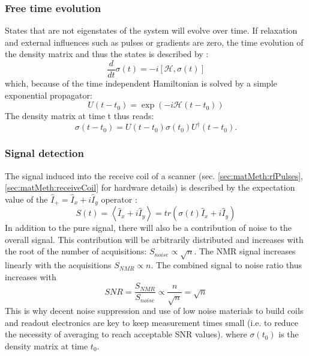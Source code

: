         \subsubsection{Free time evolution}
        States that are not eigenstates of the system will evolve over time. If relaxation and external influences such as pulses or gradients are zero, the time evolution of the density matrix and thus the states is described by \cite{sakurai_modern_2017, levitt_spin_nodate}:
        \begin{equation}
            \frac{d}{dt} \sigma(t) = -i \left[\mathcal{H}, \sigma(t)\right]
        \end{equation}
        which, because of the time independent Hamiltonian is solved by a simple exponential propagator:
        \begin{equation*}
            U(t-t_0) = \exp(-i\mathcal{H}(t-t_0))
        \end{equation*}
        The density matrix at time t thus reads:
        \begin{equation}
            \sigma(t-t_0) = U(t-t_0) \sigma(t_0) U^\dagger(t-t_0).
        \end{equation}
        \subsubsection{Signal detection}
        The signal induced into the receive coil of a scanner (sec. \ref{sec:matMeth:rfPulses}, \ref{sec:matMeth:receiveCoil} for hardware details) is described by the expectation value of the $\hat{I}_+ = \hat{I}_x + i\hat{I}_y$ operator \cite{levitt_spin_nodate}:
        \begin{equation}
            S(t) = \left< \hat{I}_x + i\hat{I}_y \right> = tr\left(\sigma(t)\hat{I}_x + i\hat{I}_y\right)
        \end{equation}
        In addition to the pure signal, there will also be a contribution of noise to the overall signal. This contribution will be arbitrarily distributed and increases with the root of the number of acquisitions: $S_{noise} \propto \sqrt{n}$. The NMR signal increases linearly with the acquisitions $S_{NMR} \propto n$. The combined signal to noise ratio thus increases with
        \begin{equation}
            SNR =  \frac{S_{NMR}}{ S_{noise}}  \propto \frac{n}{\sqrt{n}} = \sqrt{n}
        \end{equation}
        This is why decent noise suppression and use of low noise materials to build coils and readout electronics are key to keep measurement times small (i.e. to reduce the necessity of averaging to reach acceptable SNR values).
        where $\sigma(t_0)$ is the density matrix at time $t_0$.
